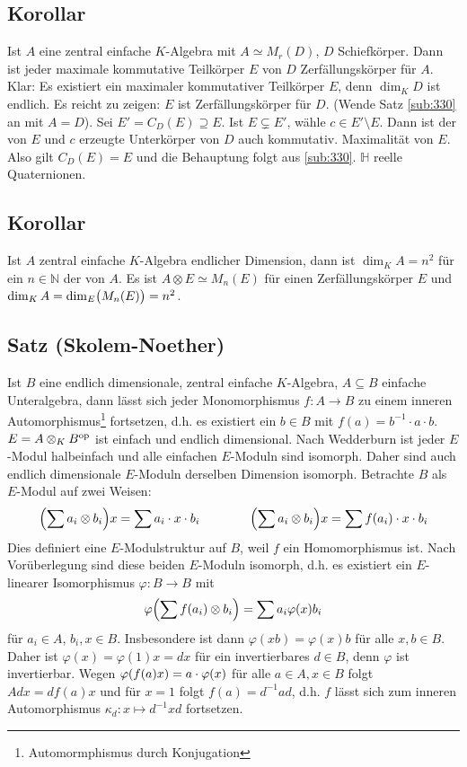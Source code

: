\subsection{Korollar} %
\label{sub:331}
Ist $A$ eine zentral einfache $K$-Algebra mit $A \simeq M_r(D)$, $D$ Schiefkörper. Dann ist jeder maximale kommutative Teilkörper $E$ von $D$ Zerfällungskörper für $A$.
Klar: Es existiert ein maximaler kommutativer Teilkörper $E$, denn $\dim_K D$ ist endlich. Es reicht zu zeigen: $E$ ist Zerfällungskörper für $D$. (Wende Satz 
\ref{sub:330} an mit $A=D$). Sei $E' = C_D(E) \supseteq E$. Ist $E \subsetneq E'$, wähle $c \in E' \setminus E$. Dann ist der von $E$ und $c$ erzeugte Unterkörper von $D$
auch kommutativ. \light Maximalität von $E$. Also gilt $C_D(E)=E$ und die Behauptung folgt aus \ref{sub:330}. \bewende
{}
$\mathbb{H}$ reelle Quaternionen. 

\subsection{Korollar} %
\label{sub:332}
Ist $A$ zentral einfache $K$-Algebra endlicher Dimension, dann ist $\dim_K A = n^2$ für ein $n \in \mathds{N}$ der  von $A$.
Es ist $A \otimes E \simeq M_n(E)$ für einen Zerfällungskörper $E$ und $\dim_K A = \dim_E \enbrace[\big]{M_n(E)} = n^2 $. \bewende

\subsection{Satz (Skolem-Noether)} %
\label{sub:333}
Ist $B$ eine endlich dimensionale, zentral einfache $K$-Algebra, $A \subseteq B$ einfache Unteralgebra, dann lässt sich jeder Monomorphismus $f : A \to B$ zu einem inneren
Automorphismus\footnote{Automormphismus durch Konjugation} fortsetzen, d.h. es existiert ein $b \in B$ mit $f(a) = b ^{-1} \cdot a \cdot b$.
$E= A \otimes_K B^\op$ ist einfach und endlich dimensional. Nach Wedderburn ist jeder $E$-Modul halbeinfach und alle einfachen $E$-Moduln sind isomorph. Daher sind
auch endlich dimensionale $E$-Moduln derselben Dimension isomorph. Betrachte $B$ als $E$-Modul auf zwei Weisen:
\[
	\enbrace*{\sum a_i \otimes b_i} x = \sum a_i \cdot x \cdot b_i \qquad \qquad \enbrace*{\sum a_i \otimes b_i} x = \sum f(a_i) \cdot x \cdot b_i  
\]
Dies definiert eine $E$-Modulstruktur auf $B$, weil $f$ ein Homomorphismus ist. Nach Vorüberlegung sind diese beiden $E$-Moduln isomorph, d.h. es existiert ein $E$-linearer
Isomorphismus $\varphi : B \to B$ mit 
\[
	\varphi \enbrace*{\sum f(a_i) \otimes b_i} = \sum a_i \varphi(x) b_i 
\]
für $a_i \in A$, $b_i, x \in B$. Insbesondere ist dann $\varphi(x b) = \varphi(x) b$ für alle $x,b \in B$. Daher ist $\varphi(x) = \varphi(1) x = d x$ für ein 
invertierbares $d \in B$, denn $\varphi$ ist invertierbar. Wegen $\varphi \enbrace*{f(a) x} = a \cdot \varphi(x) $ für alle $a \in A, x \in B$ folgt 
$A d x = d f(a) x$ und für $x=1$ folgt $f(a) = d ^{-1} a d$, d.h. $f$ lässt sich zum inneren Automorphismus $\kappa_d : x \mapsto d ^{-1} x d$ fortsetzen. \bewende


